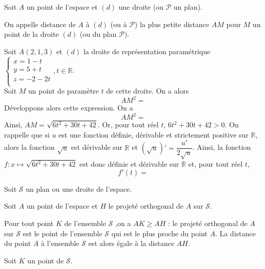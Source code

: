 \documentclass[11pt,fleqn, openany]{book} %
\begin{document}
\begin{definition}Soit $A$ un point de l'espace et $(d)$ une droite (ou $\mathcal{P}$ un plan). 

On appelle distance de $A$ à $(d)$ (ou à $\mathcal{P}$) la plus petite distance $AM$ pour $M$ un point de la droite $(d)$ (ou du plan $\mathcal{P}$).\end{definition}

\begin{example}Soit $A(2,1,3)$ et $(d)$ la droite de représentation paramétrique $\left\{ \begin{array}{l}x=1-t \\ y=5+t \\ z = -2-2t \\\end{array}\right., t \in \mathbb{R}$. \\Soit $M$ un point de paramètre $t$ de cette droite. On a alors
\[AM^2=\]
Développons alors cette expression. On a
\[AM^2=\]
Ainsi, $AM=\sqrt{6t^2+30t+42}$. Or, pour tout réel $t$, $6t^2+30t+42>0$. On rappelle que si $u$ est une fonction définie, dérivable et strictement positive sur $\mathbb{R}$, alors la fonction $\sqrt{u}$ est dérivable sur $\mathbb{R}$ et $(\sqrt{u})'=\dfrac{u'}{2\sqrt{u}}$. Ainsi, la fonction $f:x\mapsto \sqrt{6t^2+30t+42}$ est donc définie et dérivable sur $\mathbb{R}$ et, pour tout réel $t$, 
\[f'(t)= \]


\vskip300pt

\end{example}

\newpage

\begin{proposition}Soit $\mathcal{S}$ un plan ou une droite de l'espace.

Soit $A$ un point de l'espace et $H$ le projeté orthogonal de $A$ sur $\mathcal{S}$.

Pour tout point $K$ de l'ensemble $\mathcal{S}$ ,on a $AK \geqslant AH$ : le projeté orthogonal de $A$ sur $\mathcal{S}$ est le point de l'ensemble $\mathcal{S}$ qui est le plus proche du point $A$. La distance du point $A$ à l'ensemble $\mathcal{S}$ est alors égale à la distance $AH$.\end{proposition}

\begin{demonstration} Soit $K$ un point de $\mathcal{S}$. 

\vskip150pt

\end{demonstration}
\end{document}
